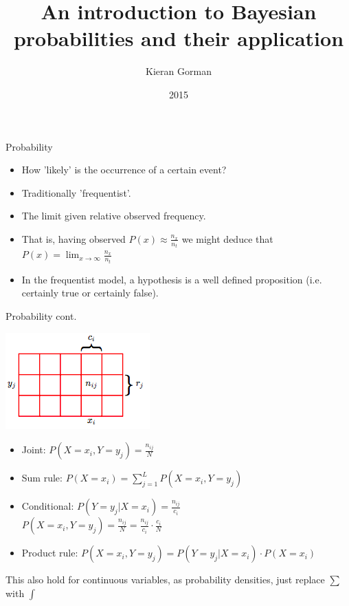 \documentclass{beamer}
\title[Degrees of belief]
      {An introduction to Bayesian probabilities and their application}
\author{Kieran Gorman}
\institute{Xero}
\date{2015}
\begin{document}
\begin{frame}
  \titlepage
\end{frame}


\begin{frame}{Probability}

  \begin{itemize}
    \setlength\itemsep{1em}
    \item How 'likely' is the occurrence of a certain event?
    \item Traditionally 'frequentist'.
    \item The limit given relative observed frequency.
    \item That is, having observed $P(x) \approx \frac{n_x}{n_t}$ we
      might deduce that $P(x) = \lim_{x\to\infty} \frac{n_x}{n_t}$
    \item In the frequentist model, a hypothesis is a well defined
      proposition (i.e. certainly true or certainly false).
  \end{itemize}

\end{frame}

\begin{frame}{Probability cont.}

  \begin{center}
    \includegraphics[scale=0.5]{pgrid}
  \end{center}

  \begin{itemize}
    \item Joint: $P(X = x_i, Y = y_j) = \frac{n_{ij}}{N}$
    \item Sum rule: $P(X = x_i) = \sum_{j=1}^{L}P(X = x_i, Y = y_j)$
    \item Conditional: $P(Y = y_j | X = x_i) = \frac{n_{ij}}{c_i}$ \\
      $P(X = x_i, Y = y_j) = \frac{n_{ij}}{N} = \frac{n_{ij}}{c_i}
      \cdot \frac{c_i}{N}$
    \item Product rule: $P(X = x_i, Y = y_j) = P(Y = y_j | X = x_i) \cdot
      P(X = x_i)$
  \end{itemize}

  \begin{center}
    {\tiny
      This also hold for continuous variables, as probability
      densities, just replace $\sum$ with $\int$
    }
  \end{center}

\end{frame}
\end{document}
